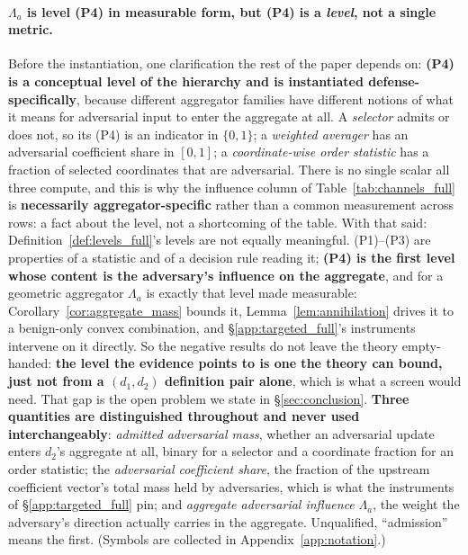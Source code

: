 \documentclass{article}
\begin{document}
\paragraph{$\Lambda_a$ is level (P4) in measurable form, but (P4) is a \emph{level}, not a single metric.} Before the instantiation, one clarification the rest of the paper depends on: \textbf{(P4) is a conceptual level of the hierarchy and is instantiated defense-specifically}, because different aggregator families have different notions of what it means for adversarial input to enter the aggregate at all. A \emph{selector} admits or does not, so its (P4) is an indicator in $\{0,1\}$; a \emph{weighted averager} has an adversarial coefficient share in $[0,1]$; a \emph{coordinate-wise order statistic} has a fraction of selected coordinates that are adversarial. There is no single scalar all three compute, and this is why the influence column of Table~\ref{tab:channels_full} is \textbf{necessarily aggregator-specific} rather than a common measurement across rows: a fact about the level, not a shortcoming of the table. With that said: Definition~\ref{def:levels_full}'s levels are not equally meaningful. (P1)--(P3) are properties of a statistic and of a decision rule reading it; \textbf{(P4) is the first level whose content is the adversary's influence on the aggregate}, and for a geometric aggregator $\Lambda_a$ is exactly that level made measurable: Corollary~\ref{cor:aggregate_mass} bounds it, Lemma~\ref{lem:annihilation} drives it to a benign-only convex combination, and §\ref{app:targeted_full}'s instruments intervene on it directly. So the negative results do not leave the theory empty-handed: \textbf{the level the evidence points to is one the theory can bound, just not from a $(d_1,d_2)$ definition pair alone}, which is what a screen would need. That gap is the open problem we state in §\ref{sec:conclusion}. \textbf{Three quantities are distinguished throughout and never used interchangeably}: \emph{admitted adversarial mass}, whether an adversarial update enters $d_2$'s aggregate at all, binary for a selector and a coordinate fraction for an order statistic; the \emph{adversarial coefficient share}, the fraction of the upstream coefficient vector's total mass held by adversaries, which is what the instruments of §\ref{app:targeted_full} pin; and \emph{aggregate adversarial influence} $\Lambda_a$, the weight the adversary's direction actually carries in the aggregate. Unqualified, ``admission'' means the first. (Symbols are collected in Appendix~\ref{app:notation}.)
\end{document}
